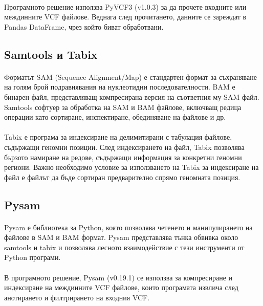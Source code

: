 \documentclass[pdftex,cyrillic,14pt,a4page,twoside,openright]{extreport}
\begin{document}
\paragraph{}
Програмното решение използва PyVCF3 (v1.0.3) за да прочете входните или междинните VCF файлове. Веднага след прочитането, данните се зареждат в Pandas DataFrame, чрез който биват обработвани.

\subsection{Samtools и Tabix}\label{sec:samtools_tabix}
\paragraph{}
Форматът SAM (Sequence Alignment/Map) е стандартен формат за съхраняване на голям брой подравнявания на нуклеотидни последователности. BAM е бинарен файл, представляващ компресирана версия на съответния му SAM файл. Samtools \cite{li2009} софтуер за обработка на SAM и BAM файлове, включващ редица операции като сортиране, инспектиране, обединяване на файлове и др.

\paragraph{}
Tabix е 	програма за индексиране на делимитирани с табулация файлове, съдържащи геномни позиции. След индексирането на файл, Tabix позволява бързото намиране на редове, съдържащи информация за конкретни геномни региони. Важно необходимо условие за използването на Tabix за индексиране на файл е файлът да бъде сортиран предварително спрямо геномната позиция. 

\subsection{Pysam}\label{sec:pysam}
\paragraph{}
Pysam \cite{pysam} е библиотека за Python, която позволява четенето и манипулирането на файлове в SAM и BAM формат. Pysam представлява тънка обвивка около samtools и tabix и позволява лесното взаимодействие с тези инструменти от Python програми.

\paragraph{}
В програмното решение, Pysam (v0.19.1) се използва за компресиране и индексиране на междинните VCF файлове, които програмата извлича след анотирането и филтрирането на входния VCF.
\end{document}
